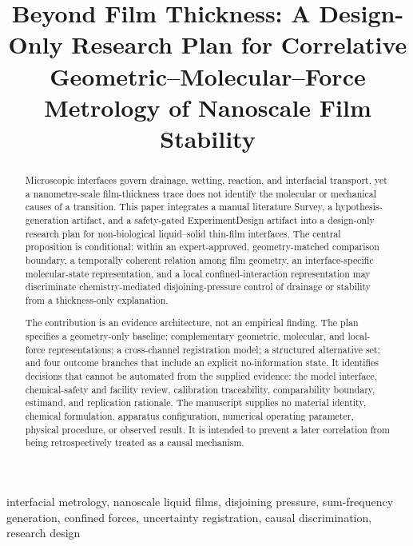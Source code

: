 \documentclass[conference]{IEEEtran}
\begin{document}
\title{Beyond Film Thickness: A Design-Only Research Plan for Correlative Geometric--Molecular--Force Metrology of Nanoscale Film Stability}

\author{
}

\maketitle

\begin{abstract}
Microscopic interfaces govern drainage, wetting, reaction, and interfacial transport, yet a nanometre-scale film-thickness trace does not identify the molecular or mechanical causes of a transition. This paper integrates a manual literature Survey, a hypothesis-generation artifact, and a safety-gated ExperimentDesign artifact into a design-only research plan for non-biological liquid--solid thin-film interfaces. The central proposition is conditional: within an expert-approved, geometry-matched comparison boundary, a temporally coherent relation among film geometry, an interface-specific molecular-state representation, and a local confined-interaction representation may discriminate chemistry-mediated disjoining-pressure control of drainage or stability from a thickness-only explanation.

The contribution is an evidence architecture, not an empirical finding. The plan specifies a geometry-only baseline; complementary geometric, molecular, and local-force representations; a cross-channel registration model; a structured alternative set; and four outcome branches that include an explicit no-information state. It identifies decisions that cannot be automated from the supplied evidence: the model interface, chemical-safety and facility review, calibration traceability, comparability boundary, estimand, and replication rationale. The manuscript supplies no material identity, chemical formulation, apparatus configuration, numerical operating parameter, physical procedure, or observed result. It is intended to prevent a later correlation from being retrospectively treated as a causal mechanism.
\end{abstract}

\begin{IEEEkeywords}
interfacial metrology, nanoscale liquid films, disjoining pressure, sum-frequency generation, confined forces, uncertainty registration, causal discrimination, research design
\end{IEEEkeywords}
\end{document}
